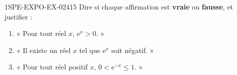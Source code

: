 \begin{exercice}{1SPE-EXPO-EX-024}{1}{5}
Dire si chaque affirmation est \textbf{vraie} ou \textbf{fausse}, et justifier :
\begin{enumerate}
  \item « Pour tout réel $x$, $\mathrm{e}^x > 0$. »
  \item « Il existe un réel $x$ tel que $\mathrm{e}^x$ soit négatif. »
  \item « Pour tout réel positif $x$, $0 < \mathrm{e}^{-x} \leqslant 1$. »
\end{enumerate}
\end{exercice}
